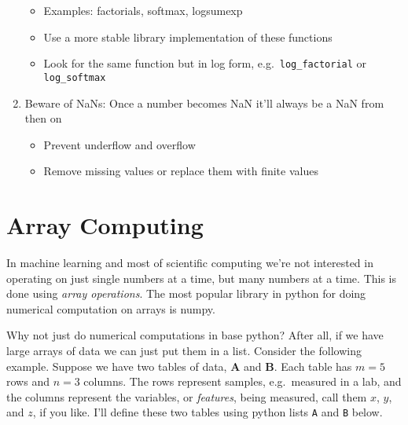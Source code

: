 \documentclass[
  letterpaper,
  DIV=11,
  numbers=noendperiod]{scrreprt}
\providecommand{\tightlist}{%
  \setlength{\itemsep}{0pt}\setlength{\parskip}{0pt}}\usepackage{longtable,booktabs,array}
\begin{document}
\begin{enumerate}
  \begin{itemize}
  \tightlist
  \item
    Examples: factorials, softmax, logsumexp
  \item
    Use a more stable library implementation of these functions
  \item
    Look for the same function but in log form,
    e.g.~\texttt{log\_factorial} or \texttt{log\_softmax}
  \end{itemize}
\item
  Beware of NaNs: Once a number becomes NaN it'll always be a NaN from
  then on

  \begin{itemize}
  \tightlist
  \item
    Prevent underflow and overflow
  \item
    Remove missing values or replace them with finite values
  \end{itemize}
\end{enumerate}

\hypertarget{array-computing}{%
\section{Array Computing}\label{array-computing}}

In machine learning and most of scientific computing we're not
interested in operating on just single numbers at a time, but many
numbers at a time. This is done using \emph{array operations}. The most
popular library in python for doing numerical computation on arrays is
numpy.

Why not just do numerical computations in base python? After all, if we
have large arrays of data we can just put them in a list. Consider the
following example. Suppose we have two tables of data, \(\mathbf{A}\)
and \(\mathbf{B}\). Each table has \(m=5\) rows and \(n=3\) columns. The
rows represent samples, e.g.~measured in a lab, and the columns
represent the variables, or \emph{features}, being measured, call them
\(x\), \(y\), and \(z\), if you like. I'll define these two tables using
python lists \texttt{A} and \texttt{B} below.
\end{document}
